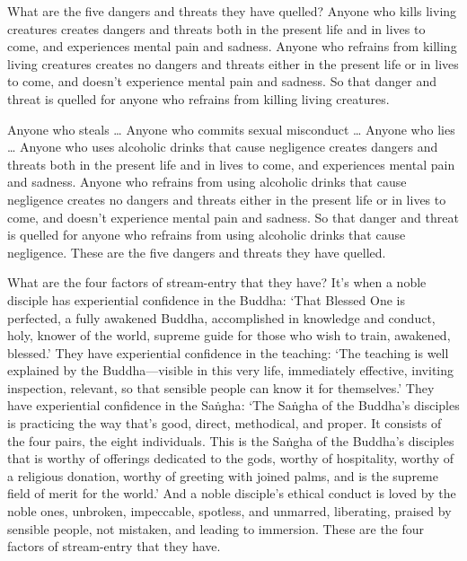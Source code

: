 \documentclass[12pt,openany]{book}%
\begin{document}
What are the five dangers and threats they have quelled? Anyone who kills living creatures creates dangers and threats both in the present life and in lives to come, and experiences mental pain and sadness. Anyone who refrains from killing living creatures creates no dangers and threats either in the present life or in lives to come, and doesn’t experience mental pain and sadness. So that danger and threat is quelled for anyone who refrains from killing living creatures. 

Anyone who steals … Anyone who commits sexual misconduct … Anyone who lies … Anyone who uses alcoholic drinks that cause negligence creates dangers and threats both in the present life and in lives to come, and experiences mental pain and sadness. Anyone who refrains from using alcoholic drinks that cause negligence creates no dangers and threats either in the present life or in lives to come, and doesn’t experience mental pain and sadness. So that danger and threat is quelled for anyone who refrains from using alcoholic drinks that cause negligence. These are the five dangers and threats they have quelled. 

What are the four factors of stream-entry that they have? It’s when a noble disciple has experiential confidence in the Buddha: ‘That Blessed One is perfected, a fully awakened Buddha, accomplished in knowledge and conduct, holy, knower of the world, supreme guide for those who wish to train, awakened, blessed.’ They have experiential confidence in the teaching: ‘The teaching is well explained by the Buddha—visible in this very life, immediately effective, inviting inspection, relevant, so that sensible people can know it for themselves.’ They have experiential confidence in the \textsanskrit{Saṅgha}: ‘The \textsanskrit{Saṅgha} of the Buddha’s disciples is practicing the way that’s good, direct, methodical, and proper. It consists of the four pairs, the eight individuals. This is the \textsanskrit{Saṅgha} of the Buddha’s disciples that is worthy of offerings dedicated to the gods, worthy of hospitality, worthy of a religious donation, worthy of greeting with joined palms, and is the supreme field of merit for the world.’ And a noble disciple’s ethical conduct is loved by the noble ones, unbroken, impeccable, spotless, and unmarred, liberating, praised by sensible people, not mistaken, and leading to immersion. These are the four factors of stream-entry that they have. 
\end{document}
